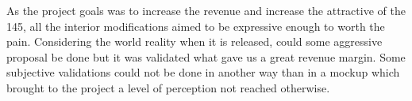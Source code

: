As the project goals was to increase the revenue and increase the attractive of the 145, all the interior modifications aimed to be expressive enough to worth the pain. Considering the world reality when it is released, could some aggressive proposal be done but it was validated what gave us a great revenue margin. Some subjective validations could not be done in another way than in a mockup which brought to the project a level of perception not reached otherwise.